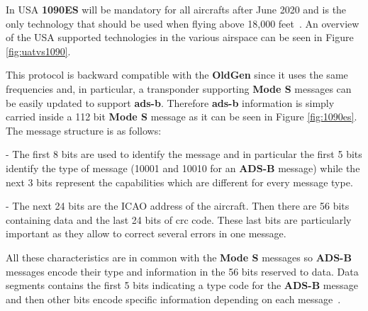 \documentclass[../main.tex]{subfiles}
\begin{document}
In USA \textbf{1090ES} will be mandatory for all aircrafts after June 2020 and is the only technology that should be used when flying above 18,000 feet~\cite{title14}. An overview of the USA supported technologies in the various airspace can be seen in Figure \ref{fig:uatvs1090}.

This protocol is backward compatible with the \textbf{OldGen} since it uses the same frequencies and, in particular, a transponder supporting \textbf{Mode S} messages can be easily updated to support \textbf{\acrshort{ads-b}}. Therefore \textbf{\acrshort{ads-b}} information is simply carried inside a 112 bit \textbf{Mode S} message as it can be seen in Figure \ref{fig:1090es}. The message structure is as follows:

- The first 8 bits are used to identify the message and in particular the first 5 bits identify the type of message (10001 and 10010 for an \textbf{ADS-B} message) while the next 3 bits represent the capabilities which are different for every message type.

- The next 24 bits are the ICAO address of the aircraft. Then there are 56 bits containing data and the last 24 bits of \acrshort{crc} code. These last bits are particularly important as they allow to correct several errors in one message.

All these characteristics are in common with the \textbf{Mode S} messages so \textbf{ADS-B} messages encode their type and information in the 56 bits reserved to data. Data segments contains the first 5 bits indicating a type code for the \textbf{ADS-B} message and then other bits encode specific information depending on each message~\cite{modesbook}.
\end{document}
